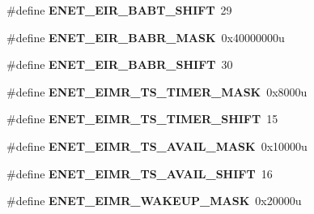 \begin{DoxyCompactItemize}
\item 
\#define {\bfseries E\+N\+E\+T\+\_\+\+E\+I\+R\+\_\+\+B\+A\+B\+T\+\_\+\+S\+H\+I\+FT}~29\hypertarget{group__ENET__Register__Masks_ga316dbe501e294bfeedecda20bb81cdc6}{}\label{group__ENET__Register__Masks_ga316dbe501e294bfeedecda20bb81cdc6}

\item 
\#define {\bfseries E\+N\+E\+T\+\_\+\+E\+I\+R\+\_\+\+B\+A\+B\+R\+\_\+\+M\+A\+SK}~0x40000000u\hypertarget{group__ENET__Register__Masks_gaa0d5f950cb5b2252eda9744944f88f17}{}\label{group__ENET__Register__Masks_gaa0d5f950cb5b2252eda9744944f88f17}

\item 
\#define {\bfseries E\+N\+E\+T\+\_\+\+E\+I\+R\+\_\+\+B\+A\+B\+R\+\_\+\+S\+H\+I\+FT}~30\hypertarget{group__ENET__Register__Masks_gabde85bd2d6099ccd0d7b5a48b648a3b2}{}\label{group__ENET__Register__Masks_gabde85bd2d6099ccd0d7b5a48b648a3b2}

\item 
\#define {\bfseries E\+N\+E\+T\+\_\+\+E\+I\+M\+R\+\_\+\+T\+S\+\_\+\+T\+I\+M\+E\+R\+\_\+\+M\+A\+SK}~0x8000u\hypertarget{group__ENET__Register__Masks_gaf036db440c529ff6fefcb0117db93840}{}\label{group__ENET__Register__Masks_gaf036db440c529ff6fefcb0117db93840}

\item 
\#define {\bfseries E\+N\+E\+T\+\_\+\+E\+I\+M\+R\+\_\+\+T\+S\+\_\+\+T\+I\+M\+E\+R\+\_\+\+S\+H\+I\+FT}~15\hypertarget{group__ENET__Register__Masks_ga3ae1d93529feddafe084f0c4709758b1}{}\label{group__ENET__Register__Masks_ga3ae1d93529feddafe084f0c4709758b1}

\item 
\#define {\bfseries E\+N\+E\+T\+\_\+\+E\+I\+M\+R\+\_\+\+T\+S\+\_\+\+A\+V\+A\+I\+L\+\_\+\+M\+A\+SK}~0x10000u\hypertarget{group__ENET__Register__Masks_gadb2e7c3e600fe3ea3694c9ebf8460f93}{}\label{group__ENET__Register__Masks_gadb2e7c3e600fe3ea3694c9ebf8460f93}

\item 
\#define {\bfseries E\+N\+E\+T\+\_\+\+E\+I\+M\+R\+\_\+\+T\+S\+\_\+\+A\+V\+A\+I\+L\+\_\+\+S\+H\+I\+FT}~16\hypertarget{group__ENET__Register__Masks_ga7af0adce91f65d4127770cbea42a00e7}{}\label{group__ENET__Register__Masks_ga7af0adce91f65d4127770cbea42a00e7}

\item 
\#define {\bfseries E\+N\+E\+T\+\_\+\+E\+I\+M\+R\+\_\+\+W\+A\+K\+E\+U\+P\+\_\+\+M\+A\+SK}~0x20000u\hypertarget{group__ENET__Register__Masks_ga5a8c25f893ae181e80d0be797b4629f3}{}\label{group__ENET__Register__Masks_ga5a8c25f893ae181e80d0be797b4629f3}


\end{DoxyCompactItemize}
